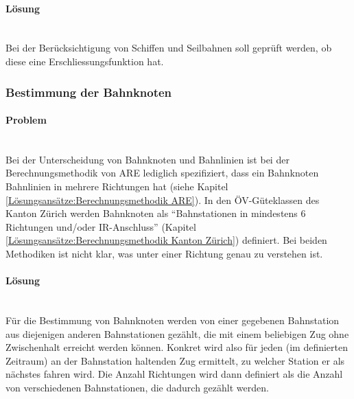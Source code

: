 \paragraph{Lösung}~\\
Bei der Berücksichtigung von Schiffen und Seilbahnen soll geprüft werden, ob diese eine Erschliessungsfunktion hat.

\subsubsection{Bestimmung der Bahnknoten}
\label{Verbesserungsmöglichkeiten:Bestimmung der Bahnknoten}

\paragraph{Problem}~\\
Bei der Unterscheidung von Bahnknoten und Bahnlinien ist bei der Berechnungsmethodik von ARE lediglich spezifiziert, dass ein Bahnknoten Bahnlinien in mehrere Richtungen hat (siehe Kapitel \ref{Lösungsansätze:Berechnungsmethodik ARE}).
In den ÖV-Güteklassen des Kanton Zürich werden Bahnknoten als "`Bahnstationen in mindestens 6 Richtungen und/oder IR-Anschluss"' (Kapitel \ref{Lösungsansätze:Berechnungsmethodik Kanton Zürich}) definiert.
Bei beiden Methodiken ist nicht klar, was unter einer Richtung genau zu verstehen ist.

\paragraph{Lösung}~\\
Für die Bestimmung von Bahnknoten werden von einer gegebenen Bahnstation aus diejenigen anderen Bahnstationen gezählt, die mit einem beliebigen Zug ohne Zwischenhalt erreicht werden können.
Konkret wird also für jeden (im definierten Zeitraum) an der Bahnstation haltenden Zug ermittelt, zu welcher Station er als nächstes fahren wird.
Die Anzahl Richtungen wird dann definiert als die Anzahl von verschiedenen Bahnstationen, die dadurch gezählt werden.
